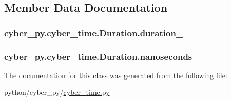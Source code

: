 \subsection{Member Data Documentation}
\hypertarget{classcyber__py_1_1cyber__time_1_1Duration_abc7dca6e0a9cf8e6f336e2b5a7e9fac3}{
\subsubsection[{duration\-\_\-}]{\setlength{\rightskip}{0pt plus 5cm}cyber\-\_\-py.\-cyber\-\_\-time.\-Duration.\-duration\-\_\-}}\label{classcyber__py_1_1cyber__time_1_1Duration_abc7dca6e0a9cf8e6f336e2b5a7e9fac3}
\hypertarget{classcyber__py_1_1cyber__time_1_1Duration_acc9cd4d365707e296573ec88b0150d11}{
\subsubsection[{nanoseconds\-\_\-}]{\setlength{\rightskip}{0pt plus 5cm}cyber\-\_\-py.\-cyber\-\_\-time.\-Duration.\-nanoseconds\-\_\-}}\label{classcyber__py_1_1cyber__time_1_1Duration_acc9cd4d365707e296573ec88b0150d11}


The documentation for this class was generated from the following file\-:\begin{DoxyCompactItemize}
\item 
python/cyber\-\_\-py/\hyperlink{cyber__time_8py}{cyber\-\_\-time.\-py}\end{DoxyCompactItemize}

